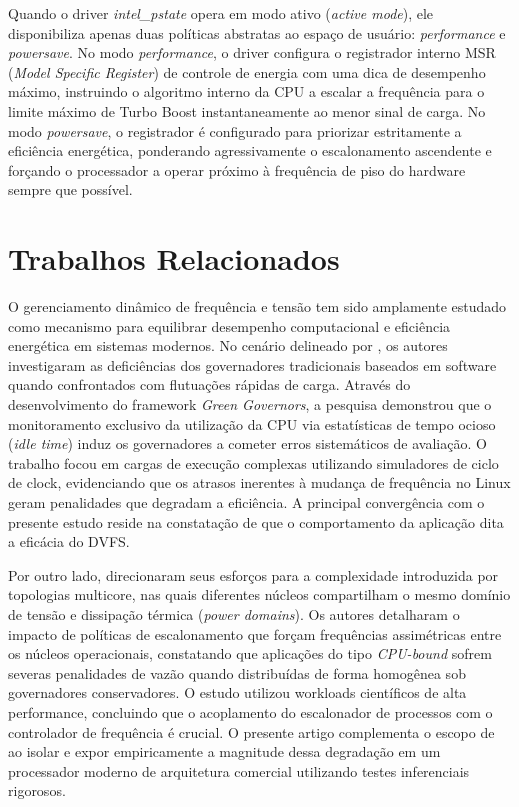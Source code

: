 \documentclass[12pt]{article}
\begin{document}
Quando o driver \textit{intel\_pstate} opera em modo ativo (\textit{active mode}), ele disponibiliza apenas duas políticas abstratas ao espaço de usuário: \textit{performance} e \textit{powersave}. No modo \textit{performance}, o driver configura o registrador interno MSR (\textit{Model Specific Register}) de controle de energia com uma dica de desempenho máximo, instruindo o algoritmo interno da CPU a escalar a frequência para o limite máximo de Turbo Boost instantaneamente ao menor sinal de carga. No modo \textit{powersave}, o registrador é configurado para priorizar estritamente a eficiência energética, ponderando agressivamente o escalonamento ascendente e forçando o processador a operar próximo à frequência de piso do hardware sempre que possível.


\section{Trabalhos Relacionados}

O gerenciamento dinâmico de frequência e tensão tem sido amplamente estudado como mecanismo para equilibrar desempenho computacional e eficiência energética em sistemas modernos. No cenário delineado por \cite{spiliopoulos2011}, os autores investigaram as deficiências dos governadores tradicionais baseados em software quando confrontados com flutuações rápidas de carga. Através do desenvolvimento do framework \textit{Green Governors}, a pesquisa demonstrou que o monitoramento exclusivo da utilização da CPU via estatísticas de tempo ocioso (\textit{idle time}) induz os governadores a cometer erros sistemáticos de avaliação. O trabalho focou em cargas de execução complexas utilizando simuladores de ciclo de clock, evidenciando que os atrasos inerentes à mudança de frequência no Linux geram penalidades que degradam a eficiência. A principal convergência com o presente estudo reside na constatação de que o comportamento da aplicação dita a eficácia do DVFS.

Por outro lado, \cite{bao2016} direcionaram seus esforços para a complexidade introduzida por topologias multicore, nas quais diferentes núcleos compartilham o mesmo domínio de tensão e dissipação térmica (\textit{power domains}). Os autores detalharam o impacto de políticas de escalonamento que forçam frequências assimétricas entre os núcleos operacionais, constatando que aplicações do tipo \textit{CPU-bound} sofrem severas penalidades de vazão quando distribuídas de forma homogênea sob governadores conservadores. O estudo utilizou workloads científicos de alta performance, concluindo que o acoplamento do escalonador de processos com o controlador de frequência é crucial. O presente artigo complementa o escopo de \cite{bao2016} ao isolar e expor empiricamente a magnitude dessa degradação em um processador moderno de arquitetura comercial utilizando testes inferenciais rigorosos.
\end{document}
